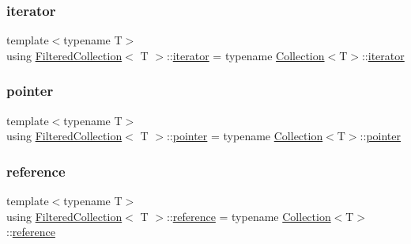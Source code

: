 \mbox{\label{class_filtered_collection_a65730aaf0a2a5307a924b44672718c74}} 
\subsubsection{\texorpdfstring{iterator}{iterator}}
{\footnotesize\ttfamily template$<$typename T$>$ \\
using \hyperlink{class_filtered_collection}{Filtered\+Collection}$<$ T $>$\+::\hyperlink{class_collection_a317dca4fdf1eb2e47643bb60c620f802}{iterator} =  typename \hyperlink{class_collection}{Collection}$<$T$>$\+::\hyperlink{class_collection_a317dca4fdf1eb2e47643bb60c620f802}{iterator}}

\mbox{\label{class_filtered_collection_a0c78e02c35e4b712b945a0e5c6b9a14a}} 
\subsubsection{\texorpdfstring{pointer}{pointer}}
{\footnotesize\ttfamily template$<$typename T$>$ \\
using \hyperlink{class_filtered_collection}{Filtered\+Collection}$<$ T $>$\+::\hyperlink{class_collection_a9a5b5d9b389c113364d527900c745efb}{pointer} =  typename \hyperlink{class_collection}{Collection}$<$T$>$\+::\hyperlink{class_collection_a9a5b5d9b389c113364d527900c745efb}{pointer}}

\mbox{\label{class_filtered_collection_afc4e47695287b6bac73899ab5bcfdf6e}} 
\subsubsection{\texorpdfstring{reference}{reference}}
{\footnotesize\ttfamily template$<$typename T$>$ \\
using \hyperlink{class_filtered_collection}{Filtered\+Collection}$<$ T $>$\+::\hyperlink{class_collection_abbc291771b11c48cd2f297a0d9fe0449}{reference} =  typename \hyperlink{class_collection}{Collection}$<$T$>$\+::\hyperlink{class_collection_abbc291771b11c48cd2f297a0d9fe0449}{reference}}

